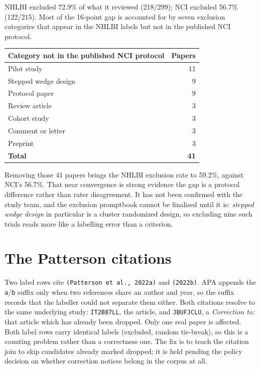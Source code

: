 \documentclass[11pt]{article}
\begin{document}
NHLBI excluded 72.9\% of what it reviewed (218/299); NCI excluded 56.7\% (122/215). Most of the
16-point gap is accounted for by seven exclusion categories that appear in the NHLBI labels but not in
the published NCI protocol.

\begin{table}[h]
\centering
\begin{tabular}{lr}
\toprule
\textbf{Category not in the published NCI protocol} & \textbf{Papers} \\
\midrule
Pilot study & 11 \\
Stepped wedge design & 9 \\
Protocol paper & 9 \\
Review article & 3 \\
Cohort study & 3 \\
Comment or letter & 3 \\
Preprint & 3 \\
\midrule
\textbf{Total} & \textbf{41} \\
\bottomrule
\end{tabular}
\end{table}

Removing those 41 papers brings the NHLBI exclusion rate to 59.2\%, against NCI's 56.7\%. That near
convergence is strong evidence the gap is a protocol difference rather than rater disagreement. It has
not been confirmed with the study team, and the exclusion promptbook cannot be finalised until it is:
\emph{stepped wedge design} in particular is a cluster randomized design, so excluding nine such trials
reads more like a labelling error than a criterion.

\section{The Patterson citations}

Two label rows cite \texttt{(Patterson et al., 2022a)} and \texttt{(2022b)}. APA appends the
\texttt{a}/\texttt{b} suffix only when two references share an author and year, so the suffix records
that the labeller could not separate them either. Both citations resolve to the same underlying study:
\texttt{IT2B87LL}, the article, and \texttt{JBUFJCLU}, a \emph{Correction to:} that article which has
already been dropped. Only one real paper is affected. Both label rows carry identical labels
(excluded, random tie-break), so this is a counting problem rather than a correctness one. The fix is
to teach the citation join to skip candidates already marked dropped; it is held pending the policy
decision on whether correction notices belong in the corpus at all.
\end{document}
